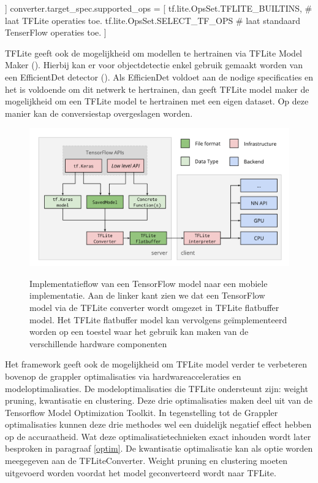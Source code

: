 \begin{python}]
converter.target_spec.supported_ops = [
	tf.lite.OpsSet.TFLITE_BUILTINS, # laat TFLite operaties toe.
	tf.lite.OpsSet.SELECT_TF_OPS # laat standaard TenserFlow operaties toe.
  ]
\end{python}	

TFLite geeft ook de mogelijkheid om modellen te hertrainen via TFLite Model Maker (\cite{tensorflow2015-whitepaper}).
Hierbij kan er voor objectdetectie enkel gebruik gemaakt worden van een EfficientDet detector (\cite{tan_efficientdet_2020}).
Als EfficienDet voldoet aan de nodige specificaties en het is voldoende om dit netwerk te hertrainen, dan geeft TFLite model maker de mogelijkheid om een TFLite model te hertrainen met een eigen dataset.
Op deze manier kan de conversiestap overgeslagen worden.

\begin{figure}[!ht]
    \centering
 	\includegraphics[width=0.85\linewidth]{fig/TFLite_workflow.png}
 	\caption{Implementatieflow van een TensorFlow model naar een mobiele implementatie. Aan de linker kant zien we dat een TensorFlow model via de TFLite converter wordt omgezet in TFLite flatbuffer model.
	 Het TFLite flatbuffer model kan vervolgens ge\"implementeerd worden op een toestel waar het gebruik kan maken van de verschillende hardware componenten}
 	\label{fig:tflite}
	\cite{tensorflow2015-whitepaper}
\end{figure}

Het framework geeft ook de mogelijkheid om TFLite model verder te verbeteren bovenop de grappler optimalisaties via hardwareacceleraties en modeloptimalisaties.
De modeloptimalisaties die TFLite ondersteunt zijn: weight pruning, kwantisatie en clustering.
Deze drie optimalisaties maken deel uit van de Tensorflow Model Optimization Toolkit.
In tegenstelling tot de Grappler optimalisaties kunnen deze drie methodes wel een duidelijk negatief effect hebben op de accuraatheid.
Wat deze optimalisatietechnieken exact inhouden wordt later besproken in paragraaf \ref{optim}.
De kwantisatie optimalisatie kan als optie worden meegegeven aan de TFLiteConverter.
Weight pruning en clustering moeten uitgevoerd worden voordat het model geconverteerd wordt naar TFLite.

